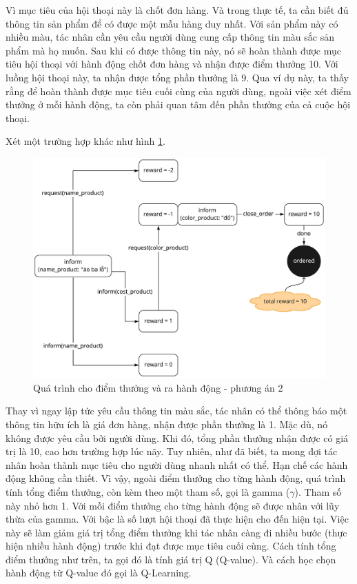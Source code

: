 Vì mục tiêu của hội thoại này là chốt đơn hàng. Và trong thực tế, ta cần biết đủ thông tin sản phẩm để có được một mẫu hàng duy nhất. Với sản phẩm này có nhiều màu, tác nhân cần yêu cầu người dùng cung cấp thông tin màu sắc sản phẩm mà họ muốn. Sau khi có được thông tin này, nó sẽ hoàn thành được mục tiêu hội thoại với hành động chốt đơn hàng và nhận được điểm thưởng 10. Với luồng hội thoại này, ta nhận được tổng phần thưởng là 9. Qua ví dụ này, ta thấy rằng để hoàn thành được mục tiêu cuối cùng của người dùng, ngoài việc xét điểm thưởng ở mỗi hành động, ta còn phải quan tâm đến phần thưởng của cả cuộc hội thoại.

Xét một trường hợp khác như hình \ref{fig:dialog3}.

\begin{center}
    \begin{figure}[h!]
        \begin{center}
         \includegraphics[scale=0.18]{chapter3/img/dialog_ex15.jpg}
        \end{center}
        \caption{Quá trình cho điểm thưởng và ra hành động - phương án 2}
        \label{fig:dialog3}
    \end{figure}
\end{center}

Thay vì ngay lập tức yêu cầu thông tin màu sắc, tác nhân có thể thông báo một thông tin hữu ích là giá đơn hàng, nhận được phần thưởng là 1. Mặc dù, nó không được yêu cầu bởi người dùng. Khi đó, tổng phần thưởng nhận được có giá trị là 10, cao hơn trường hợp lúc nãy. Tuy nhiên, như đã biết, ta mong đợi tác nhân hoàn thành mục tiêu cho người dùng nhanh nhất có thể. Hạn chế các hành động không cần thiết. Vì vậy, ngoài điểm thưởng cho từng hành động, quá trình tính tổng điểm thưởng, còn kèm theo một tham số, gọi là gamma ($\gamma$). Tham số này nhỏ hơn 1. Với mỗi điểm thưởng cho từng hành động sẽ được nhân với lũy thừa của gamma. Với bậc là số lượt hội thoại đã thực hiện cho đến hiện tại. Việc này sẽ làm giảm giá trị tổng điểm thưởng khi tác nhân càng đi nhiều bước (thực hiện nhiều hành động) trước khi đạt được mục tiêu cuối cùng. Cách tính tổng điểm thưởng như trên, ta gọi đó là tính giá trị Q (Q-value). Và cách học chọn hành động từ Q-value đó gọi là Q-Learning.

